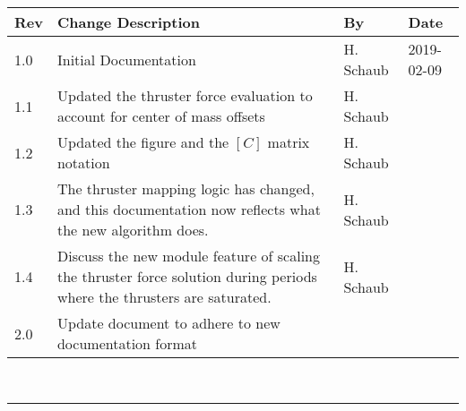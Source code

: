 \documentclass[]{BasiliskReportMemo}
\begin{document}
\makeCover
%
%
\pagestyle{empty}
{\renewcommand{\arraystretch}{2}
\noindent
\begin{longtable}{|p{0.5in}|p{3.5in}|p{1.07in}|p{0.9in}|}
\hline
{\bfseries Rev} & {\bfseries Change Description} & {\bfseries By}& {\bfseries Date} \\
\hline
1.0 & Initial Documentation & H. Schaub & 2019-02-09\\
\hline
1.1 & Updated the thruster force evaluation to account for center of mass offsets & H. Schaub \\
\hline
1.2 & Updated the figure and the $[C]$ matrix notation & H. Schaub \\
\hline
1.3 & The thruster mapping logic has changed, and this documentation now reflects what the new algorithm does. & H. Schaub \\
\hline
1.4 & Discuss the new module feature of scaling the thruster force solution during periods where the thrusters are saturated. & H. Schaub \\
\hline
2.0 & Update document to adhere to new documentation format \\
\hline

\end{longtable}
}



\newpage
\setcounter{page}{1}
\pagestyle{fancy}

\tableofcontents %
~\\ \hrule ~\\ %



	






\end{document}
